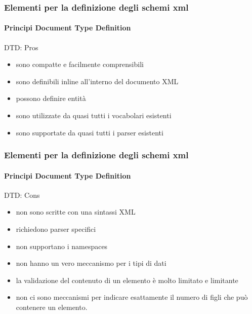 \begin{frame}
    \frametitle{Elementi per la definizione degli schemi xml}
    \framesubtitle{Principi Document Type Definition}
    \addtocounter{nframe}{1}

    \begin{block}{DTD: Pros}
        \begin{itemize}
            \item sono compatte e facilmente comprensibili
            \item sono definibili inline all'interno del documento XML
            \item possono definire entità
            \item sono utilizzate da quasi tutti i vocabolari esistenti
            \item sono supportate da quasi tutti i parser esistenti
        \end{itemize}
    \end{block}

\end{frame}

\begin{frame}
    \frametitle{Elementi per la definizione degli schemi xml}
    \framesubtitle{Principi Document Type Definition}
    \addtocounter{nframe}{1}

    \begin{block}{DTD: Cons}
        \begin{itemize}
            \item non sono scritte con una sintassi XML
            \item richiedono parser specifici
            \item non supportano i namespaces
            \item non hanno un vero meccanismo per i tipi di dati
            \item la validazione del contenuto di un elemento è molto limitato e limitante
            \item non ci sono meccanismi per indicare esattamente il numero di figli che può contenere un elemento.
        \end{itemize}
    \end{block}

\end{frame}





